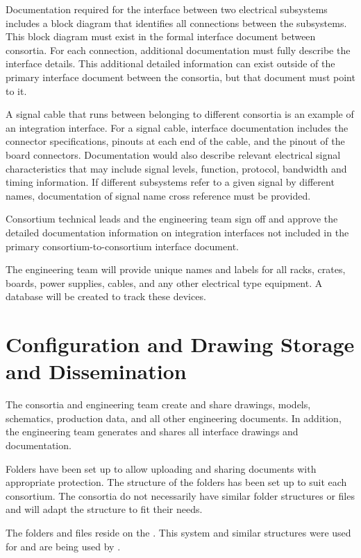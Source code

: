 Documentation required for the interface between two electrical
subsystems includes a block diagram that identifies all connections
between the subsystems.  This block diagram must exist in the formal
interface document between consortia.  For each connection, additional
documentation must fully describe the interface details. This
additional detailed information can exist outside of the primary
interface document between the consortia, but that document must point
to it.


A signal cable that runs between  belonging to different
consortia is an example of an integration interface.  For a signal
cable, interface documentation includes the connector specifications,
pinouts at each end of the cable, and the pinout of the board
connectors.  Documentation would also describe relevant electrical
signal characteristics that may include signal levels, function,
protocol, bandwidth and timing information.  If different subsystems
refer to a given signal by different names, documentation of signal
name cross reference must be provided.

Consortium technical leads and the  engineering team sign off
and approve the detailed documentation information on integration
interfaces not included in the primary consortium-to-consortium
interface document.

The  engineering team will provide unique names and labels
for all racks, crates, boards, power supplies, cables, and any other
electrical type equipment.  A database will be created to track these
devices.

\section{Configuration and Drawing Storage and Dissemination}
\label{sec:fdsp-coord-integ-modelplan}

The consortia and  engineering team create and share
drawings, models, schematics, production data, and all other
engineering documents. In addition, the  engineering team
generates and shares all interface drawings and documentation.

Folders have been set up to allow uploading and sharing documents
with appropriate protection. The structure of the folders has been set
up to suit each consortium. The consortia do not necessarily have
similar folder structures or files  and will adapt the structure to fit
their needs.

The folders and files reside on the . This system and
similar structures were used for  and are being
used by .

